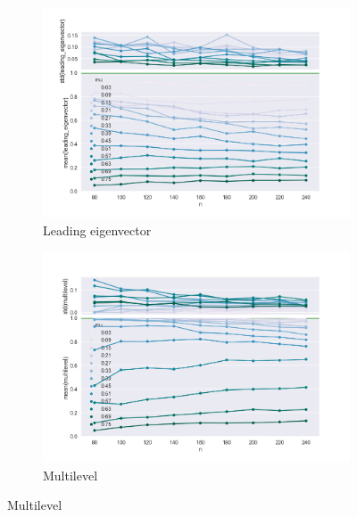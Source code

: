 \begin{figure}
    \begin{subfigure}[b]{0.32\textwidth}
        \includegraphics[width=\textwidth]{fig/ami_vs_n_leading_eigenvector}
        \caption{Leading eigenvector}
        \label{fig:tiger}
    \end{subfigure}
    \qquad
    \begin{subfigure}[b]{0.32\textwidth}
        \includegraphics[width=\textwidth]{fig/ami_vs_n_multilevel}
        \caption{Multilevel}
        \label{fig:mouse}
    \end{subfigure}


\end{figure}
